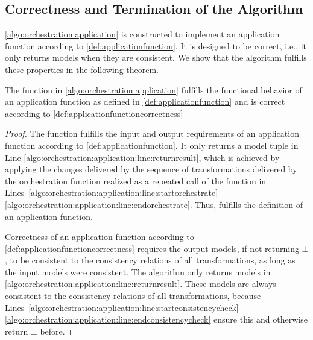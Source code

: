 



\subsection{Correctness and Termination of the Algorithm}
\label{chap:orchestration:decidability:correctness_termination}

\autoref{algo:orchestration:application} is constructed to implement an application function according to \autoref{def:applicationfunction}.
It is designed to be correct, i.e., it only returns models when they are consistent.
We show that the algorithm fulfills these properties in the following theorem.

\begin{theorem}
    The  function in \autoref{algo:orchestration:application} fulfills the functional behavior of an application function as defined in \autoref{def:applicationfunction} and is correct according to \autoref{def:applicationfunctioncorrectness}
\end{theorem}
\begin{proof}
    The  function fulfills the input and output requirements of an application function according to \autoref{def:applicationfunction}.
    It only returns a model tuple in Line \ref{algo:orchestration:application:line:returnresult}, which is achieved by applying the changes delivered by the sequence of transformations delivered by the orchestration function realized as a repeated call of the  function in Lines~\ref{algo:orchestration:application:line:startorchestrate}--\ref{algo:orchestration:application:line:endorchestrate}.
    Thus,  fulfills the definition of an application function.

    Correctness of an application function according to \autoref{def:applicationfunctioncorrectness} requires the output models, if not returning $\bot$, to be consistent to the consistency relations of all transformations, as long as the input models were consistent.
    The algorithm only returns models in \autoref{algo:orchestration:application:line:returnresult}.
    These models are always consistent to the consistency relations of all transformations, because Lines~\ref{algo:orchestration:application:line:startconsistencycheck}--\ref{algo:orchestration:application:line:endconsistencycheck} ensure this and otherwise return $\bot$ before.
\end{proof}

